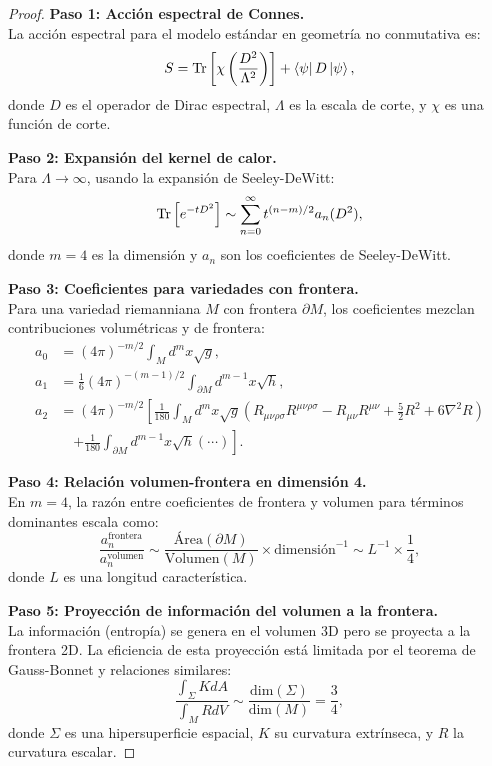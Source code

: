 \documentclass[11pt, a4paper]{article}
\theoremstyle{plain}
\theoremstyle{definition}
\begin{document}
\begin{proof}
\textbf{Paso 1: Acción espectral de Connes.} \\
La acción espectral para el modelo estándar en geometría no conmutativa es:
\begin{equation}
S = \Tr\left[\chi\left(\frac{D^2}{\Lambda^2}\right)\right] + \bra{\psi} D \ket{\psi},
\end{equation}
donde $D$ es el operador de Dirac espectral, $\Lambda$ es la escala de corte, y $\chi$ es una función de corte.

\textbf{Paso 2: Expansión del kernel de calor.} \\
Para $\Lambda \to \infty$, usando la expansión de Seeley-DeWitt:
\begin{equation}
\Tr\left[e^{-tD^2}\right] \sim \sum_{n=0}^\infty t^{(n-m)/2} a_n(D^2),
\end{equation}
donde $m=4$ es la dimensión y $a_n$ son los coeficientes de Seeley-DeWitt.

\textbf{Paso 3: Coeficientes para variedades con frontera.} \\
Para una variedad riemanniana $M$ con frontera $\partial M$, los coeficientes mezclan contribuciones volumétricas y de frontera:
\begin{align}
a_0 &= (4\pi)^{-m/2} \int_M d^m x \sqrt{g}, \\
a_1 &= \frac{1}{6}(4\pi)^{-(m-1)/2} \int_{\partial M} d^{m-1} x \sqrt{h}, \\
a_2 &= (4\pi)^{-m/2} \left[\frac{1}{180} \int_M d^m x \sqrt{g} (R_{\mu\nu\rho\sigma}R^{\mu\nu\rho\sigma} - R_{\mu\nu}R^{\mu\nu} + \frac{5}{2}R^2 + 6\nabla^2 R) \right. \\
&\quad \left. + \frac{1}{180} \int_{\partial M} d^{m-1} x \sqrt{h} (\cdots) \right].
\end{align}

\textbf{Paso 4: Relación volumen-frontera en dimensión 4.} \\
En $m=4$, la razón entre coeficientes de frontera y volumen para términos dominantes escala como:
\begin{equation}
\frac{a_n^{\text{frontera}}}{a_n^{\text{volumen}}} \sim \frac{\text{Área}(\partial M)}{\text{Volumen}(M)} \times \text{dimensión}^{-1} \sim L^{-1} \times \frac{1}{4},
\end{equation}
donde $L$ es una longitud característica.

\textbf{Paso 5: Proyección de información del volumen a la frontera.} \\
La información (entropía) se genera en el volumen 3D pero se proyecta a la frontera 2D. La eficiencia de esta proyección está limitada por el teorema de Gauss-Bonnet y relaciones similares:
\begin{equation}
\frac{\int_{\Sigma} K dA}{\int_M R dV} \sim \frac{\text{dim}(\Sigma)}{\text{dim}(M)} = \frac{3}{4},
\end{equation}
donde $\Sigma$ es una hipersuperficie espacial, $K$ su curvatura extrínseca, y $R$ la curvatura escalar.


\end{proof}
\end{document}
